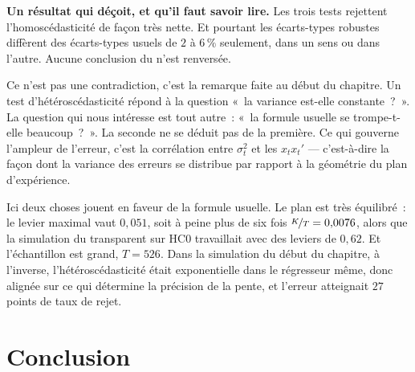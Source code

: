 \documentclass[10pt]{beamer}
\begin{document}
\begin{notes}

  \textbf{Un résultat qui déçoit, et qu'il faut savoir lire.} Les trois tests
  rejettent l'homoscédasticité de façon très nette. Et pourtant les écarts-types
  robustes diffèrent des écarts-types usuels de $2$ à $6\,\%$ seulement, dans un
  sens ou dans l'autre. Aucune conclusion du  n'est renversée.

  \bigskip

  Ce n'est pas une contradiction, c'est la remarque faite au début du chapitre.
  Un test d'hétéroscédasticité répond à la question «~la variance est-elle
  constante~?~». La question qui nous intéresse est tout autre~: «~la formule
  usuelle se trompe-t-elle beaucoup~?~». La seconde ne se déduit pas de la
  première. Ce qui gouverne l'ampleur de l'erreur, c'est la corrélation entre
  $\sigma_t^2$ et les $x_tx_t'$ — c'est-à-dire la façon dont la variance des
  erreurs se distribue par rapport à la géométrie du plan d'expérience.

  \bigskip

  Ici deux choses jouent en faveur de la formule usuelle. Le plan est très
  équilibré~: le levier maximal vaut $0{,}051$, soit à peine plus de six fois
  $\nicefrac{K}{T} = 0{,}0076$, alors que la simulation du transparent sur HC0
  travaillait avec des leviers de $0{,}62$. Et l'échantillon est grand,
  $T=526$. Dans la simulation du début du chapitre, à l'inverse,
  l'hétéroscédasticité était exponentielle dans le régresseur même, donc
  alignée sur ce qui détermine la précision de la pente, et l'erreur atteignait
  $27$ points de taux de rejet.

  \bigskip


\end{notes}


\section{Conclusion}
\end{document}
